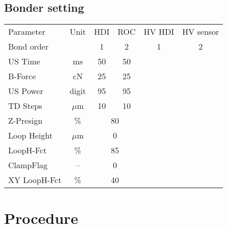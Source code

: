 \documentclass[12pt]{unlsilabsop}
\begin{document}
\subsection{Bonder setting}

\begin{tabular}{lc|cc|cc}
\toprule
Parameter & Unit & HDI & ROC & HV HDI & HV sensor \\
\multicolumn{2}{l|}{Bond order} & 1 & 2 & 1 & 2 \\
    \midrule
US Time      &  ms    & 50 & 50  \\
B-Force      &  cN    & 25 & 25 \\
US Power     & digit  & 95 & 95 \\
TD Steps     & $\mu$m & 10 & 10 \\
    \midrule
Z-Presign    & \%     & \multicolumn{2}{|c|}{80} \\
Loop Height  & $\mu$m & \multicolumn{2}{|c|}{0 } \\
LoopH-Fct    & \%     & \multicolumn{2}{|c|}{85} \\
ClampFlag    & --     & \multicolumn{2}{|c|}{0 } \\
XY LoopH-Fct & \%     & \multicolumn{2}{|c|}{40} \\
   \bottomrule
\end{tabular}

\section{Procedure}
\end{document}
